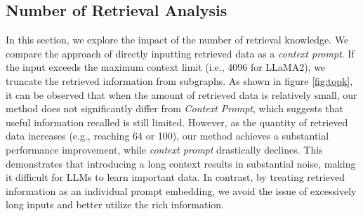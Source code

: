 \subsection{Number of Retrieval Analysis}
In this section, we explore the impact of the number of retrieval knowledge. We compare the approach of directly inputting retrieved data as a \textit{context prompt}. If the input exceeds the maximum context limit (i.e., 4096 for LLaMA2), we truncate the retrieved information from subgraphs. As shown in figure \ref{fig:topk}, it can be observed that when the amount of retrieved data is relatively small, our method does not significantly differ from  \textit{Context Prompt}, which suggests that useful information recalled is still limited.
However, as the quantity of retrieved data increases (e.g., reaching 64 or 100), our method achieves a substantial performance improvement, while \textit{context prompt} drastically declines. This demonstrates that introducing a long context results in substantial noise, making it difficult for LLMs to learn important data.
In contrast, by treating retrieved information as an individual prompt embedding, we avoid the issue of excessively long inputs and better utilize the rich information.



